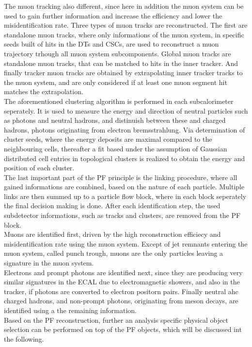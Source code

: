 The muon tracking also different, since here in addition the muon system can be used to gain further information and increase the efficiency and lower the misidentification rate. Three types of muon tracks are reconstructed. The first are standalone muon tracks, where only informations of the muon system, in specific seeds built of hits in the DTs and CSCs, are used to reconstruct a muon trajectory trhough all muon system subcomponents. Global muon tracks are standalone muon tracks, that can be matched to hits in the inner tracker. And finally tracker muon tracks are obtained by extrapolating inner tracker tracks to the muon system, and are only considered if at least one muon segment hit matches the extrapolation.\\
The aforementioned clustering algorithm is performed in each subcalorimeter seperately. It is used to measure the energy and direction of neutral particles such as photons and neutral hadrons, and distinuish between these and charged hadrons, photons originating from electron bremsstrahlung. Via determination of cluster seeds, where the energy deposits are maximal compared to the neighbouring cells, thereafter a fit based under the assumption of Gaussian distributed cell entries in topological clusters is realized to obtain the energy and position of each cluster.\\
The last important part of the PF principle is the linking procedure, where all gained informations are combined, based on the nature of each particle. Multiple links are then summed up to a particle flow block, where in each block seperately the final decision making is done. After each identification step, the used subdetector informations, such as tracks and clusters, are removed from the PF block.\\
Muons are identified first, driven by the high reconstruction efficiecy and misidentification rate using the muon system. Except of jet remnants entering the muon system, called punch trough, muons are the only particles leaving a signature in the muon system.\\
Electrons and prompt photons are identified next, since they are producing very similar signatures in the ECAL due to electromagnetic showers, and also in the tracker, if photons are converted to electron positorn pairs. Finally neutral ahc charged hadrons, and non-prompt photons, \eg originating from meson decays, are identified using a the remaining information.\\
Based on the PF reconstruction, further an analysis specific physical object selection can be performed on top of the PF objects, which will be discussed int the following.
















